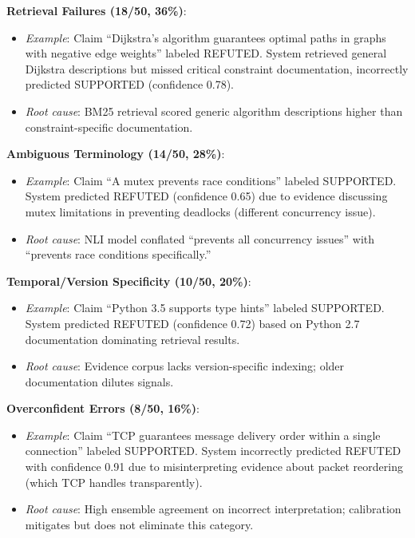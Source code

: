 \textbf{Retrieval Failures (18/50, 36\%)}:

\begin{itemize}
\item
  \emph{Example}: Claim ``Dijkstra's algorithm guarantees optimal paths in graphs with negative edge weights'' labeled REFUTED. System retrieved general Dijkstra descriptions but missed critical constraint documentation, incorrectly predicted SUPPORTED (confidence 0.78).
\item
  \emph{Root cause}: BM25 retrieval scored generic algorithm descriptions higher than constraint-specific documentation.
\end{itemize}

\textbf{Ambiguous Terminology (14/50, 28\%)}:

\begin{itemize}
\item
  \emph{Example}: Claim ``A mutex prevents race conditions'' labeled SUPPORTED. System predicted REFUTED (confidence 0.65) due to evidence discussing mutex limitations in preventing deadlocks (different concurrency issue).
\item
  \emph{Root cause}: NLI model conflated ``prevents all concurrency issues'' with ``prevents race conditions specifically.''
\end{itemize}

\textbf{Temporal/Version Specificity (10/50, 20\%)}:

\begin{itemize}
\item
  \emph{Example}: Claim ``Python 3.5 supports type hints'' labeled SUPPORTED. System predicted REFUTED (confidence 0.72) based on Python 2.7 documentation dominating retrieval results.
\item
  \emph{Root cause}: Evidence corpus lacks version-specific indexing; older documentation dilutes signals.
\end{itemize}

\textbf{Overconfident Errors (8/50, 16\%)}:

\begin{itemize}
\item
  \emph{Example}: Claim ``TCP guarantees message delivery order within a single connection'' labeled SUPPORTED. System incorrectly predicted REFUTED with confidence 0.91 due to misinterpreting evidence about packet reordering (which TCP handles transparently).
\item
  \emph{Root cause}: High ensemble agreement on incorrect interpretation; calibration mitigates but does not eliminate this category.
\end{itemize}


